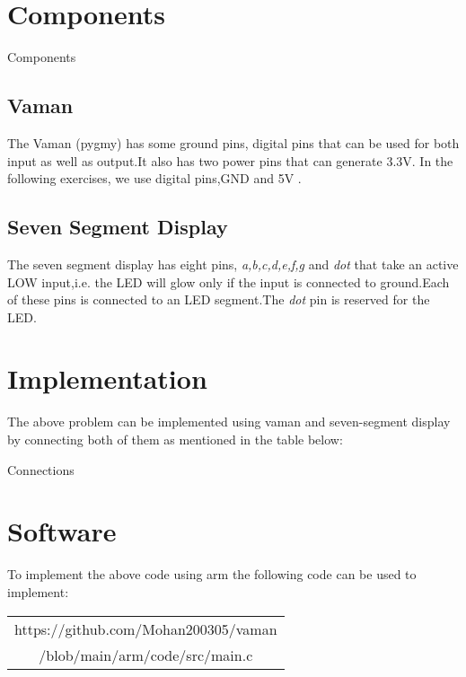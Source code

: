\documentclass[10pt,a4paper]{article}
\begin{document}
\section{Components}
\begin{table}[!h]
\centering

\caption{Components}
\label{table:components}
\end{table}
\subsection{Vaman} 
The Vaman (pygmy) has some ground pins, digital pins that can be used for both input as well as output.It also has two power pins that can generate 3.3V. In the following exercises, we use digital pins,GND and 5V .
\subsection{Seven Segment Display}
The seven segment display has eight pins, \emph{a,b,c,d,e,f,g} and \emph{dot} that take an active LOW input,i.e. the LED will glow only if the input is connected to ground.Each of these pins is connected to an LED segment.The \emph{dot} pin is reserved for the LED.
\section{Implementation}
The above problem can be implemented using vaman and seven-segment display by connecting both of them as mentioned in the table below:
\begin{table}[h]
	\centering
	
	\caption{Connections}
	\label{table:Connections}
\end{table}
\section{Software}
To implement the above code using arm the following code can be used to implement:
\begin{table}[h]
	\centering
	\begin{tabular}{|c|}
	\hline
	https://github.com/Mohan200305/vaman\\
	/blob/main/arm/code/src/main.c\\
	\hline
        \end{tabular}
\end{table}\\
\end{document}
